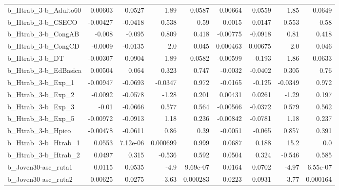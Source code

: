 \begin{tabular}{lrrrrrrrr}
b\_Htrab\_3-b\_Adulto60       &     0.00603 &       0.0527 &      1.89 &   0.0587 &    0.00664 &      0.0559 &         1.85 &        0.0649 \\
b\_Htrab\_3-b\_CSECO          &    -0.00427 &      -0.0418 &     0.538 &     0.59 &     0.0015 &      0.0147 &        0.553 &          0.58 \\
b\_Htrab\_3-b\_CongAB         &      -0.008 &       -0.095 &     0.809 &    0.418 &   -0.00775 &     -0.0918 &         0.81 &         0.418 \\
b\_Htrab\_3-b\_CongCD         &     -0.0009 &      -0.0135 &       2.0 &    0.045 &   0.000463 &     0.00675 &          2.0 &         0.046 \\
b\_Htrab\_3-b\_DT             &    -0.00307 &      -0.0904 &      1.89 &   0.0582 &   -0.00599 &      -0.193 &         1.86 &        0.0633 \\
b\_Htrab\_3-b\_EdBasica       &     0.00504 &        0.064 &     0.323 &    0.747 &    -0.0032 &     -0.0402 &        0.305 &          0.76 \\
b\_Htrab\_3-b\_Exp\_1          &    -0.00947 &      -0.0693 &   -0.0347 &    0.972 &    -0.0165 &      -0.125 &      -0.0349 &         0.972 \\
b\_Htrab\_3-b\_Exp\_2          &     -0.0092 &      -0.0578 &     -1.28 &    0.201 &    0.00431 &      0.0261 &        -1.29 &         0.197 \\
b\_Htrab\_3-b\_Exp\_3          &       -0.01 &      -0.0666 &     0.577 &    0.564 &   -0.00566 &     -0.0372 &        0.579 &         0.562 \\
b\_Htrab\_3-b\_Exp\_5          &    -0.00972 &      -0.0913 &      1.18 &    0.236 &   -0.00842 &     -0.0781 &         1.18 &         0.237 \\
b\_Htrab\_3-b\_Hpico          &    -0.00478 &      -0.0611 &      0.86 &     0.39 &    -0.0051 &      -0.065 &        0.857 &         0.391 \\
b\_Htrab\_3-b\_Htrab\_1        &      0.0553 &     7.12e-06 &  0.000699 &    0.999 &     0.0687 &       0.188 &         15.2 &           0.0 \\
b\_Htrab\_3-b\_Htrab\_2        &      0.0497 &        0.315 &    -0.536 &    0.592 &     0.0504 &       0.324 &       -0.546 &         0.585 \\
b\_Joven30-asc\_ruta1        &      0.0115 &       0.0535 &      -4.9 & 9.69e-07 &     0.0164 &      0.0702 &        -4.97 &      6.55e-07 \\
b\_Joven30-asc\_ruta2        &     0.00625 &       0.0275 &     -3.63 & 0.000283 &     0.0223 &      0.0931 &        -3.77 &      0.000164 \\

\end{tabular}
